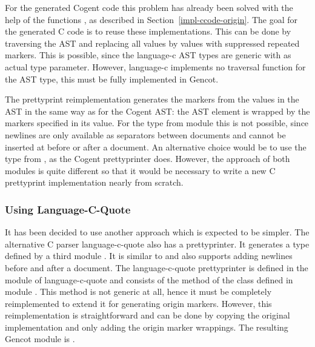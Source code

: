 For the generated Cogent code this problem has already been solved with the help of the functions , as described in Section~\ref{impl-ccode-origin}. The goal
for the generated C code is to reuse these implementations. This can be done by traversing the AST and replacing 
all  values by  values with suppressed repeated markers. This is possible, since the
language-c AST types are generic with  as actual type parameter. However, language-c implements 
no traversal function for the AST type, this must be fully implemented in Gencot.

The prettyprint reimplementation generates the markers from the  values in the AST
in the same way as for the Cogent AST: the AST element is wrapped by the markers specified in its  value.
For the type  from module  this is not possible, since newlines are only
available as separators between documents and cannot be inserted at before or after a document. An alternative choice
would be to use the type  from , as the Cogent prettyprinter does.
However, the approach of both modules is quite different so that it would be necessary to write a new C 
prettyprint implementation nearly from scratch. 

\subsubsection{Using Language-C-Quote}

It has been decided to use another approach which is expected to be simpler. The alternative C parser language-c-quote 
also has a prettyprinter. It generates a type  defined by a third module .
It is similar to  and also supports adding newlines before and after a document.
The language-c-quote prettyprinter is defined in the module  of language-c-quote and consists
of the method  of the class  defined in module .
This method is not generic at all, hence it must be completely reimplemented to extend it for generating origin 
markers. However, this reimplementation is straightforward and can be done by copying the original implementation
and only adding the origin marker wrappings. The resulting Gencot module is .

